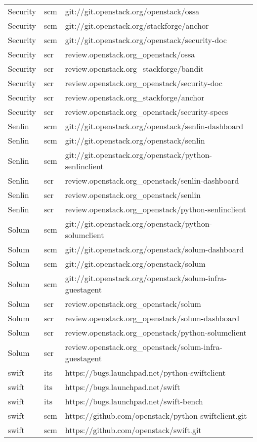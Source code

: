 \begin{center}
\begin{longtable}{|p{4cm}|p{1cm}|p{10cm}|}
Security&scm&git://git.openstack.org/openstack/ossa\\ 
Security&scm&git://git.openstack.org/stackforge/anchor\\ 
Security&scm&git://git.openstack.org/openstack/security-doc\\ 
Security&scr&review.openstack.org\_openstack/ossa\\ 
Security&scr&review.openstack.org\_stackforge/bandit\\ 
Security&scr&review.openstack.org\_openstack/security-doc\\ 
Security&scr&review.openstack.org\_stackforge/anchor\\ 
Security&scr&review.openstack.org\_openstack/security-specs\\ 
Senlin&scm&git://git.openstack.org/openstack/senlin-dashboard\\ 
Senlin&scm&git://git.openstack.org/openstack/senlin\\ 
Senlin&scm&git://git.openstack.org/openstack/python-senlinclient\\ 
Senlin&scr&review.openstack.org\_openstack/senlin-dashboard\\ 
Senlin&scr&review.openstack.org\_openstack/senlin\\ 
Senlin&scr&review.openstack.org\_openstack/python-senlinclient\\ 
Solum&scm&git://git.openstack.org/openstack/python-solumclient\\ 
Solum&scm&git://git.openstack.org/openstack/solum-dashboard\\ 
Solum&scm&git://git.openstack.org/openstack/solum\\ 
Solum&scm&git://git.openstack.org/openstack/solum-infra-guestagent\\ 
Solum&scr&review.openstack.org\_openstack/solum\\ 
Solum&scr&review.openstack.org\_openstack/solum-dashboard\\ 
Solum&scr&review.openstack.org\_openstack/python-solumclient\\ 
Solum&scr&review.openstack.org\_openstack/solum-infra-guestagent\\ 
swift&its&https://bugs.launchpad.net/python-swiftclient\\ 
swift&its&https://bugs.launchpad.net/swift\\ 
swift&its&https://bugs.launchpad.net/swift-bench\\ 
swift&scm&https://github.com/openstack/python-swiftclient.git\\ 
swift&scm&https://github.com/openstack/swift.git\\ 

\end{longtable}
\end{center}
